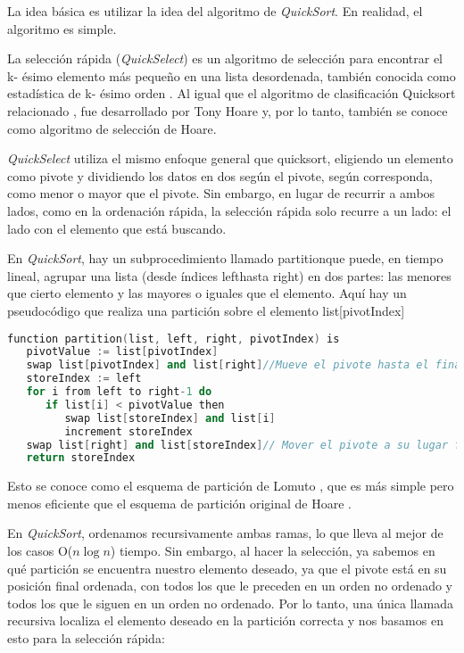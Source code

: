 La idea básica es utilizar la idea del algoritmo de \emph{QuickSort}. En realidad, el algoritmo es simple.

La selección rápida (\emph{QuickSelect}) es un algoritmo de selección para encontrar el k- ésimo elemento más pequeño en una lista desordenada, también conocida como estadística de k- ésimo orden . Al igual que el algoritmo de clasificación Quicksort relacionado , fue desarrollado por Tony Hoare y, por lo tanto, también se conoce como algoritmo de selección de Hoare.

\emph{QuickSelect} utiliza el mismo enfoque general que quicksort, eligiendo un elemento como pivote y dividiendo los datos en dos según el pivote, según corresponda, como menor o mayor que el pivote. Sin embargo, en lugar de recurrir a ambos lados, como en la ordenación rápida, la selección rápida solo recurre a un lado: el lado con el elemento que está buscando.

En \emph{QuickSort}, hay un subprocedimiento llamado partitionque puede, en tiempo lineal, agrupar una lista (desde índices lefthasta right) en dos partes: las menores que cierto elemento y las mayores o iguales que el elemento. Aquí hay un pseudocódigo que realiza una partición sobre el elemento list[pivotIndex]

\begin{lstlisting}[language=C++]
function partition(list, left, right, pivotIndex) is
   pivotValue := list[pivotIndex]
   swap list[pivotIndex] and list[right]//Mueve el pivote hasta el final
   storeIndex := left
   for i from left to right-1 do
      if list[i] < pivotValue then
         swap list[storeIndex] and list[i]
         increment storeIndex
   swap list[right] and list[storeIndex]// Mover el pivote a su lugar final 
   return storeIndex
\end{lstlisting}

Esto se conoce como el esquema de partición de Lomuto , que es más simple pero menos eficiente que el esquema de partición original de Hoare .

En \emph{QuickSort}, ordenamos recursivamente ambas ramas, lo que lleva al mejor de los casos O($n\log n$) tiempo. Sin embargo, al hacer la selección, ya sabemos en qué partición se encuentra nuestro elemento deseado, ya que el pivote está en su posición final ordenada, con todos los que le preceden en un orden no ordenado y todos los que le siguen en un orden no ordenado. Por lo tanto, una única llamada recursiva localiza el elemento deseado en la partición correcta y nos basamos en esto para la selección rápida:


